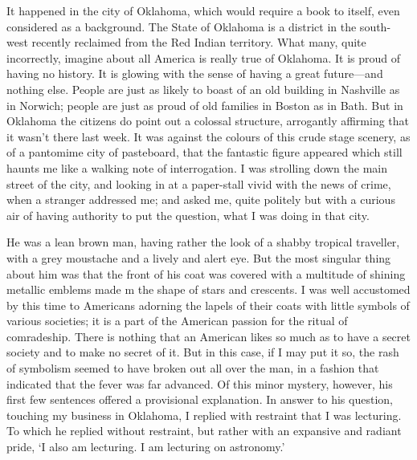 \documentclass{book}
\begin{document}
It happened in the city of Oklahoma, which would require a book to itself, even considered as a background. The State of Oklahoma is a district in the south-west recently reclaimed from the Red Indian territory. What many, quite incorrectly, imagine about all America is really true of Oklahoma. It is proud of having no history. It is glowing with the sense of having a great future—and nothing else. People are just as likely to boast of an old building in Nashville as in Norwich; people are just as proud of old families in Boston as in Bath. But in Oklahoma the citizens do point out a colossal structure, arrogantly affirming that it wasn’t there last week. It was against the colours of this crude stage scenery, as of a pantomime city of pasteboard, that the fantastic figure appeared which still haunts me like a walking note of interrogation. I was strolling down the main street of the city, and looking in at a paper-stall vivid with the news of crime, when a stranger addressed me; and asked me, quite politely but with a curious air of having authority to put the question, what I was doing in that city.

He was a lean brown man, having rather the look of a shabby tropical traveller, with a grey moustache and a lively and alert eye. But the most singular thing about him was that the front of his coat was covered with a multitude of shining metallic emblems made m the shape of stars and crescents. I was well accustomed by this time to Americans adorning the lapels of their coats with little symbols of various societies; it is a part of the American passion for the ritual of comradeship. There is nothing that an American likes so much as to have a secret society and to make no secret of it. But in this case, if I may put it so, the rash of symbolism seemed to have broken out all over the man, in a fashion that indicated that the fever was far advanced. Of this minor mystery, however, his first few sentences offered a provisional explanation. In answer to his question, touching my business in Oklahoma, I replied with restraint that I was lecturing. To which he replied without restraint, but rather with an expansive and radiant pride, ‘I also am lecturing. I am lecturing on astronomy.’
\end{document}
